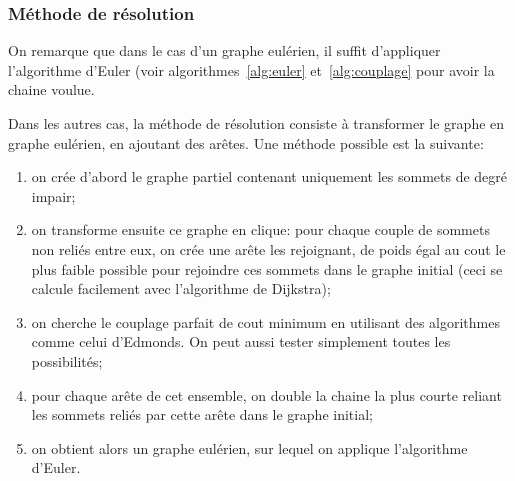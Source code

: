   \subsubsection{Méthode de résolution}
    On remarque que dans le cas d'un graphe eulérien, il suffit d'appliquer
    l'algorithme d'Euler (voir algorithmes~\ref{alg:euler}
    et~\ref{alg:couplage} pour avoir la chaine voulue.

    Dans les autres cas, la méthode de résolution consiste à transformer le
    graphe en graphe eulérien, en ajoutant des arêtes. Une méthode possible
    est la suivante:
    \begin{enumerate}
      \item on crée d'abord le graphe partiel contenant uniquement les sommets
        de degré impair;
      \item on transforme ensuite ce graphe en clique: pour chaque couple de
        sommets non reliés entre eux, on crée une arête les rejoignant,
        de poids égal au cout le plus faible possible pour rejoindre ces
        sommets dans le graphe initial (ceci se calcule facilement avec
        l'algorithme de Dijkstra);
      \item on cherche le couplage parfait de cout minimum en utilisant des
        algorithmes comme celui d'Edmonds. On peut aussi tester simplement
        toutes les possibilités;
      \item pour chaque arête de cet ensemble, on double la chaine la plus
        courte reliant les sommets reliés par cette arête dans le graphe initial;
      \item on obtient alors un graphe eulérien, sur lequel on applique
        l'algorithme d'Euler.
    \end{enumerate}

